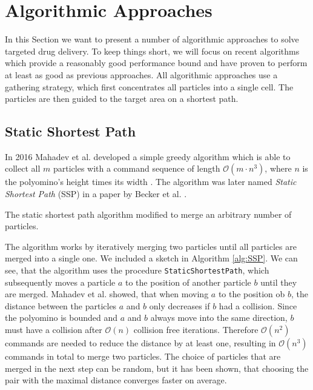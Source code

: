 \section{Algorithmic Approaches} \label{sec:TDDPreviousWork}
In this Section we want to present a number of algorithmic approaches to solve targeted drug delivery. To keep things short, we will focus on recent algorithms which provide a reasonably good performance bound and have proven to perform at least as good as previous approaches. All algorithmic approaches use a gathering strategy, which first concentrates all particles into a single cell. The particles are then guided to the target area on a shortest path.

\subsection{Static Shortest Path}
In 2016 Mahadev et al. developed a simple greedy algorithm which is able to collect all $m$ particles with a command sequence of length $\mathcal{O}(m \cdot n^3)$, where $n$ is the polyomino's height times its width \cite{mahadev2016collecting}. The algorithm was later named \textit{Static Shortest Path} (SSP) in a paper by Becker et al. \cite{becker2020}. 

\begin{algorithm}[ht]


    
    \caption[Static Shortest Path Algorithm]{The static shortest path algorithm modified to merge an arbitrary number of particles.} \label{alg:SSP}
\end{algorithm}

The algorithm works by iteratively merging two particles until all particles are merged into a single one. We included a sketch in Algorithm \ref{alg:SSP}. We can see, that the algorithm uses the procedure \texttt{StaticShortestPath}, which subsequently moves a particle $a$ to the position of another particle $b$ until they are merged. Mahadev et al. showed, that when moving $a$ to the position ob $b$, the distance between the particles $a$ and $b$ only decreases if $b$ had a collision. Since the polyomino is bounded and $a$ and $b$ always move into the same direction, $b$ must have a collision after $\mathcal{O}(n)$ collision free iterations. Therefore $\mathcal{O}(n^2)$ commands are needed to reduce the distance by at least one, resulting in $\mathcal{O}(n^3)$ commands in total to merge two particles. The choice of particles that are merged in the next step can be random, but it has been shown, that choosing the pair with the maximal distance converges faster on average.


